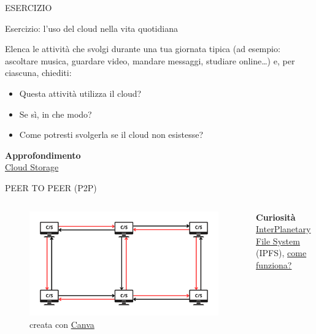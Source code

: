 \documentclass[aspectratio=1610]{beamer}
\begin{document}
\begin{frame}{ESERCIZIO}
    \begin{alertblock}{Esercizio: l’uso del cloud nella vita quotidiana}
        \begin{minipage}{0.98\linewidth}
            \justifying
            Elenca le attività che svolgi durante una tua giornata tipica (ad esempio: ascoltare musica, guardare video, mandare messaggi, studiare online…) e, per ciascuna, chiediti:
            \begin{itemize}
                \item Questa attività utilizza il cloud?
                \item Se sì, in che modo?
                \item Come potresti svolgerla se il cloud non esistesse?
            \end{itemize}
            \bigskip
            \tiny{\textbf{Approfondimento}}\\
            \tiny{\href{https://www.geopop.it/cloud-storage-cose-consente-di-esempi-come-funziona-pro-contro/}{Cloud Storage}}
        \end{minipage}
    \end{alertblock}
\end{frame}


\begin{frame}{PEER TO PEER (P2P)}
    \begin{columns}
        \begin{figure}
            \includegraphics[width=\linewidth]{img/p2p.png}
            \caption{{creata con \href{https://www.canva.com/}{Canva}}}
        \end{figure}
        \tiny{
            \textbf{Curiosità}\\
            \href{https://ipfs.tech/}{InterPlanetary File System} (IPFS), 
            \href{https://www.insidemarketing.it/ipfs-come-funziona}{come funziona?}\\
        }
    \end{columns}
\end{frame}
\end{document}
